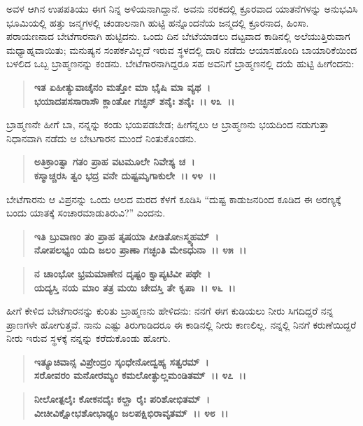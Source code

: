 ಅವಳ ಆಗಿನ ಉಪಪತಿಯು ಈಗ ನಿನ್ನ ಅಳಿಯನಾಗಿದ್ದಾನೆ. ಅವನು ನರಕದಲ್ಲಿ ಕ್ರೂರವಾದ ಯಾತನೆಗಳನ್ನು ಅನುಭವಿಸಿ ಭೂಮಿಯಲ್ಲಿ ಹತ್ತು ಜನ್ಮಗಳಲ್ಲಿ ಚಂಡಾಲನಾಗಿ ಹುಟ್ಟಿ ಹನ್ನೊಂದನೆಯ ಜನ್ಮದಲ್ಲಿ ಕ್ರೂರನಾದ, ಹಿಂಸಾ. ಪರಾಯಣನಾದ ಬೇಟೆಗಾರನಾಗಿ ಹುಟ್ಟಿದನು. ಒಂದು ದಿನ ಬೇಟೆಯಾಡಲು ದಟ್ಟವಾದ ಕಾಡಿನಲ್ಲಿ ಅಲೆಯುತ್ತಿರುವಾಗ ಮಧ್ಯಾಹ್ನವಾಯಿತು; ಮನುಷ್ಯನ ಸಂಪರ್ಕವಿಲ್ಲದೆ ಇರುವ ಸ್ಥಳದಲ್ಲಿ ದಾರಿ ನಡೆದು ಆಯಾಸಹೊಂದಿ ಬಾಯಾರಿಕೆಯಿಂದ ಬಳಲಿದ ಒಬ್ಬ ಬ್ರಾಹ್ಮಣನನ್ನು ಕಂಡನು. ಬೇಟೆಗಾರನಾಗಿದ್ದರೂ ಸಹ ಅವನಿಗೆ ಬ್ರಾಹ್ಮಣನಲ್ಲಿ ದಯೆ ಹುಟ್ಟಿ ಹೀಗೆಂದನು:

\begin{verse}
\textbf{ಇತ ಏಹೀತ್ಯುವಾಚೈನಂ ಮತ್ತೋ ಮಾ ಭೈಷಿ ಮಾ ವ್ಯಥ~।}\\\textbf{ಭಯಾದಪಸಸಾರಾಸೌ ಕ್ಲಾಂತೋ ಗಚ್ಛನ್ ಶನೈಃ ಶನೈಃ~।। ೪೩~।। }
\end{verse}

ಬ್ರಾಹ್ಮಣನೇ ಹೀಗೆ ಬಾ, ನನ್ನನ್ನು ಕಂಡು ಭಯಪಡಬೇಡ; ಹೀಗೆನ್ನಲು ಆ ಬ್ರಾಹ್ಮಣನು ಭಯದಿಂದ ನಡುಗುತ್ತಾ ನಿಧಾನವಾಗಿ ನಡೆದು ಆ ಬೇಟಗಾರನ ಮುಂದೆ ನಿಂತುಕೊಂಡನು.

\begin{verse}
\textbf{ಅತಿಕ್ರಾಂತ್ವಾ ಗತಂ ಪ್ರಾಹ ವಟಮೂಲೇ ನಿವೇಶ್ಯ ಚ~।}\\\textbf{ಕಸ್ಮಾಚ್ಚರಸಿ ತ್ವಂ ಭದ್ರ ವನೇ ದುಷ್ಟಮೃಗಾಕುಲೇ~।। ೪೪~।। }
\end{verse}

ಬೇಟೆಗಾರನು ಆ ವಿಪ್ರನನ್ನು ಒಂದು ಆಲದ ಮರದ ಕೆಳಗೆ ಕೂಡಿಸಿ “ದುಷ್ಟ ಕಾಡುಜನರಿಂದ ಕೂಡಿದ ಈ ಅರಣ್ಯಕ್ಕೆ ಬಂದು ಯಾತಕ್ಕೆ ಸಂಚಾರಮಾಡುತಿರುವಿ?” ಎಂದನು.

\begin{verse}
\textbf{ಇತಿ ಬ್ರುವಾಣಂ ತಂ ಪ್ರಾಹ ತೃಷಯಾ ಪೀಡಿತೋsಸ್ಮ್ಯಹಮ್~।}\\\textbf{ನೋಪಲಭ್ಯಂ ಯದಿ ಜಲಂ ಪ್ರಾಣಾ ಗಚ್ಛಂತಿ ಮೇಽಧುನಾ~।। ೪೫~।। }
\end{verse}

\begin{verse}
\textbf{ನ ಚಾಂಭೋ ಭ್ರಮಮಾಣೇನ ದೃಷ್ಟಂ ಕ್ವಾಪ್ಯಟಿವೀ ಪಥೇ~।}\\\textbf{ಯದ್ಯಸ್ತಿ ನಯ ಮಾಂ ತತ್ರ ಮಯಿ ಚೇದಸ್ತಿ ತೇ ಕೃಪಾ~।। ೪೬~।।}
\end{verse}

ಹೀಗೆ ಕೇಳಿದ ಬೇಟೆಗಾರನನ್ನು ಕುರಿತು ಬ್ರಾಹ್ಮಣನು ಹೇಳಿದನು: ನನಗೆ ಈಗ ಕುಡಿಯಲು ನೀರು ಸಿಗದಿದ್ದರೆ ನನ್ನ ಪ್ರಾಣಗಳೇ ಹೋಗುತ್ತವೆ. ನಾನು ಎಷ್ಟು ತಿರುಗಾಡಿದರೂ ಈ ಕಾಡಿನಲ್ಲಿ ನೀರು ಕಾಣಲಿಲ್ಲ. ನನ್ನಲ್ಲಿ ನಿನಗೆ ಕರುಣೆಯಿದ್ದರೆ ನೀರು ಇರುವ ಸ್ಥಳಕ್ಕೆ ನನ್ನನ್ನು ಕರೆದುಕೊಂಡು ಹೋಗು.

\begin{verse}
\textbf{ಇತ್ಯೂಚಿವಾನ್ಸ ವಿಪ್ರೇಂದ್ರಂ ಸ್ಕಂಧೇನೋದ್ವಹ್ಯ ಸತ್ವರಮ್~।}\\\textbf{ಸರೋವರಂ ಮನೋರಮ್ಯಂ ಕಮಲೋತ್ಫುಲ್ಲಮಂಡಿತಮ್~।। ೪೭~।। }
\end{verse}

\begin{verse}
\textbf{ನೀಲೋತ್ಪಲೈಃ ಕೋಕನದೈಃ ಕಲ್ಹಾ ರೈಃ ಪರಿಶೋಭಿತಮ್~।}\\\textbf{ವೀಚೀವಿಕ್ಷೋಭಶೋಭಾಢ್ಯಂ ಜಲಪಕ್ಷಿಭಿರಾವೃತಮ್~।। ೪೮~।। }
\end{verse}

